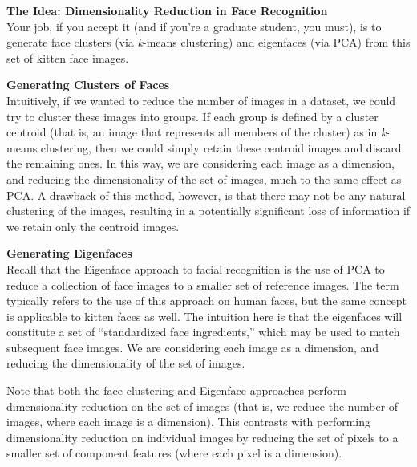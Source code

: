 \documentclass[paper=a4, fontsize=11pt]{scrartcl} %
\numberwithin{equation}{section} %
\numberwithin{figure}{section} %
\numberwithin{table}{section} %
\begin{document}
\vspace{8pt}

\textbf{The Idea:  Dimensionality Reduction in Face Recognition}\\
Your job, if you accept it (and if you're a graduate student, you must), is to generate face clusters (via \textit{k}-means clustering) and eigenfaces (via PCA) from this set of kitten face images.

\vspace{6pt}

\textbf{Generating Clusters of Faces}\\
Intuitively, if we wanted to reduce the number of images in a dataset, we could try to cluster these images into groups. If each group is defined by a cluster centroid (that is, an image that represents all members of the cluster) as in \textit{k}-means clustering, then we could simply retain these centroid images and discard the remaining ones. In this way, we are considering each image as  a dimension, and reducing the dimensionality of the set of images, much to the same effect as PCA. A drawback of this method, however, is that there may not be any natural clustering of the images, resulting in a potentially significant loss of information if we retain only the centroid images.

\vspace{6pt}

\textbf{Generating Eigenfaces}\\
Recall that the Eigenface approach to facial recognition is the use of PCA to reduce a collection of face images to a smaller set of reference images. The term typically refers to the use of this approach on human faces, but the same concept is applicable to kitten faces as well. The intuition here is that the eigenfaces will constitute a set of ``standardized face ingredients,'' which may be used to match subsequent face images. We are considering each image as a dimension, and reducing the dimensionality of the set of images.

\vspace{6pt}

Note that both the face clustering and Eigenface approaches perform dimensionality reduction on the set of images (that is, we reduce the number of images, where each image is a dimension). This contrasts with performing dimensionality reduction on individual images by reducing the set of pixels to a smaller set of component features (where each pixel is a dimension).

\vspace{8pt}
\end{document}
